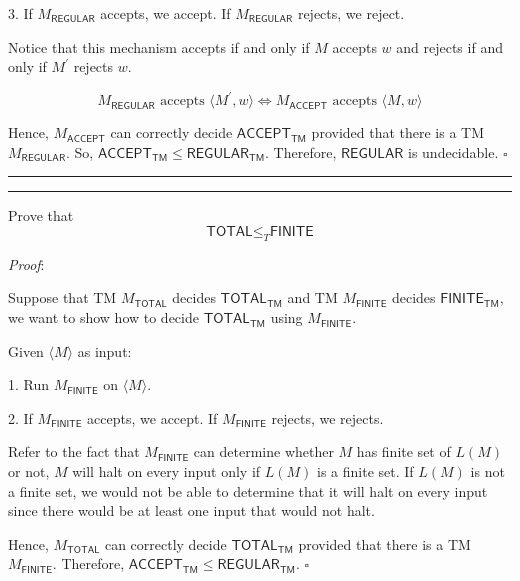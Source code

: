 \documentclass[a4paper, 11pt]{article}
\newcommand{\question}[2] {\vspace{.25in} \hrule\vspace{0.5em}
	\noindent{\bf #1: #2} \vspace{0.5em}
	\hrule \vspace{.10in}}
\begin{document}
	3. If $M_{\textsf{REGULAR}}$ accepts, we accept. If $M_{\textsf{REGULAR}}$ rejects, we reject.
	
	Notice that this mechanism accepts if and only if $M$ accepts $w$ and rejects if and only if $M^\prime$ rejects $w$. 
	
	$$ M_{\textsf{REGULAR}} \text{ accepts }\langle M^\prime,w \rangle \iff M_{\textsf{ACCEPT}} \text{ accepts } \langle M,w\rangle $$
	
	Hence, $M_{\textsf{ACCEPT}}$ can correctly decide $\textsf{ACCEPT}_{\textsf{TM}}$ provided that there is a TM $M_{\textsf{REGULAR}}$. So, $\textsf{ACCEPT}_{\textsf{TM}} \leq \textsf{REGULAR}_{\textsf{TM}} $. Therefore, $\textsf{REGULAR}$ is undecidable. $\square$
	
	\question{5}{Silver Lining If P = NP}
	
	Prove that 
	$$ \textsf{TOTAL} \leq_T \textsf{FINITE} $$
	
	{\em Proof}: 
	
	Suppose that TM $M_{\textsf{TOTAL}}$ decides $\textsf{TOTAL}_{\textsf{TM}}$ and TM $M_{\textsf{FINITE}}$ decides $\textsf{FINITE}_{\textsf{TM}}$, we want to show how to decide $\textsf{TOTAL}_{\textsf{TM}}$ using $M_{\textsf{FINITE}}$.
	
	Given $\langle M \rangle$ as input:
	
	
	1. Run $M_{\textsf{FINITE}}$ on $\langle M \rangle$.
	
	2. If $M_{\textsf{FINITE}}$ accepts, we accept. If $M_{\textsf{FINITE}}$ rejects, we rejects.
	 
	Refer to the fact that $M_{\textsf{FINITE}}$ can determine whether $M$ has finite set of $L(M)$ or not, $M$ will halt on every input only if $L(M)$ is a finite set. If $L(M)$ is not a finite set, we would not be able to determine that it will halt on every input since there would be at least one input that would not halt.
	
	Hence, $M_{\textsf{TOTAL}}$ can correctly decide $\textsf{TOTAL}_{\textsf{TM}}$ provided that there is a TM $M_{\textsf{FINITE}}$. Therefore, $\textsf{ACCEPT}_{\textsf{TM}} \leq \textsf{REGULAR}_{\textsf{TM}} $. $\square$
	
	
\end{document}
